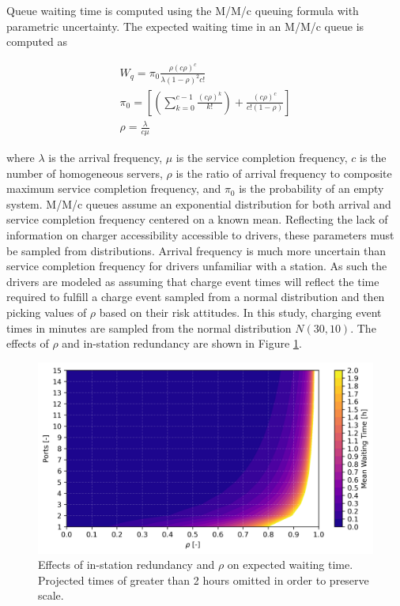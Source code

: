 Queue waiting time is computed using the M/M/c queuing formula with parametric uncertainty. The expected waiting time in an M/M/c queue is computed as

\begin{gather}
	W_q = \pi_0\frac{\rho(c\rho)^c}{\lambda(1-\rho)^2c!}\\
	\pi_0=\left[\left(\sum_{k = 0}^{c - 1}\frac{(c\rho)^k}{k!}\right) + \frac{(c\rho)^c}{c!(1 - \rho)}\right]\\
	\rho = \frac{\lambda}{c\mu}
\end{gather}

where $\lambda$ is the arrival frequency, $\mu$ is the service completion frequency, $c$ is the number of homogeneous servers, $\rho$ is the ratio of arrival frequency to composite maximum service completion frequency, and $\pi_0$ is the probability of an empty system. M/M/c queues assume an exponential distribution for both arrival and service completion frequency centered on a known mean. Reflecting the lack of information on charger accessibility accessible to drivers, these parameters must be sampled from distributions. Arrival frequency is much more uncertain than service completion frequency for drivers unfamiliar with a station. As such the drivers are modeled as assuming that charge event times will reflect the time required to fulfill a charge event sampled from a normal distribution and then picking values of $\rho$ based on their risk attitudes. In this study, charging event times in minutes are sampled from the normal distribution $N(30, 10)$. The effects of $\rho$ and in-station redundancy are shown in Figure \ref{fig:reduncancy_rho_wq}.

\begin{figure}[H]
	\centering
	\includegraphics[width = \linewidth]{figs/waiting_time_rho_ports.png}
	\caption{Effects of in-station redundancy and $\rho$ on expected waiting time. Projected times of greater than 2 hours omitted in order to preserve scale.}
	\label{fig:reduncancy_rho_wq}
\end{figure}

